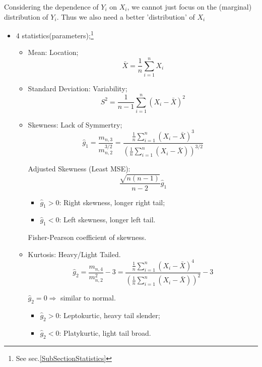     Considering the dependence of $ Y_i $ on $ X_i $, we cannot just focus on the (marginal) distribution of $ Y_i $. Thus we also need a better 'distribution' of $ X_i $
    \begin{itemize}[topsep=2pt,itemsep=2pt]
        \item 4 statistics(parameters);\footnote{See sec.\ref{SubSectionStatistics}}
        \begin{itemize}[topsep=2pt,itemsep=2pt]
            \item Mean: Location;
            \[
                \bar{X}=\dfrac{1}{n}\sum_{i=1}^nX_i 
            \]
            \item Standard Deviation: Variability;
            \[
                S^2=\dfrac{1}{n-1}\sum_{i=1}^n(X_i-\bar{X}) ^2
            \]
            
            
            \item Skewness: Lack of Symmertry;
            \[
                \hat{g}_1=\dfrac{m_{n,3}}{m_{n,2}^{3/2}}=\dfrac{\frac{1}{n}\sum\limits_{i=1}^n(X_i-\bar{X})^3}{\left( \frac{1}{n}\sum\limits_{i=1}^n(X_i-\bar{X}) \right)^{3/2}} 
            \]

            Adjusted Skewness (Least MSE):
            \[
                \dfrac{\sqrt{n(n-1)}}{n-2}\hat{g}_1 
            \]
            
            \begin{itemize}[topsep=2pt,itemsep=2pt]
                \item $ \hat{g}_1>0 $: Right skewness, longer right tail;
                \item $ \hat{g}_1<0 $: Left skewness, longer left tail.
            \end{itemize}
            
                
            Fisher-Pearson coefficient of skewness.


            \item Kurtosis: Heavy/Light Tailed.
            \[
                \hat{g}_2=\dfrac{m_{n,4}}{m_{n,2}^2}-3= \dfrac{\frac{1}{n}\sum\limits_{i=1}^n(X_i-\bar{X})^4}{\left( \frac{1}{n}\sum\limits_{i=1}^n(X_i-\bar{X}) \right)^{2}} -3
            \]

            $ \hat{g}_2=0 \Rightarrow $ similar to normal.
            \begin{itemize}[topsep=2pt,itemsep=2pt]
                \item $ \hat{g}_2>0 $: Leptokurtic, heavy tail slender;
                \item $ \hat{g}_2<0 $: Platykurtic, light tail  broad.
            \end{itemize}
            

\end{itemize}
\end{itemize}
